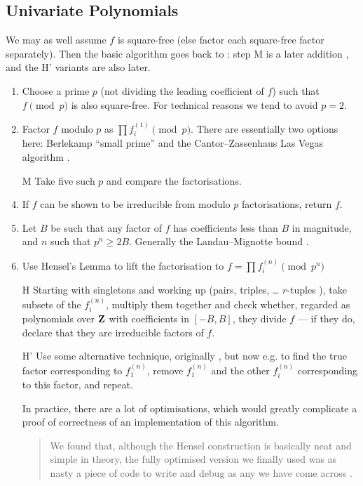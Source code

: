 \documentclass{llncs}
\begin{document}
\subsection{Univariate Polynomials}
We may as well assume $f$ is square-free (else factor each square-free factor separately). Then the basic algorithm goes back to \cite{Zassenhaus1969}: step M is a later addition \cite{Musser1975a}, and the  H' variants are also later.
\begin{enumerate}
\item Choose a prime $p$ (not dividing the leading coefficient of $f$) such that $f\pmod p$ is also square-free. For technical reasons we tend to avoid $p=2$.
\item\label{step:p} Factor $f$ modulo $p$ as $\prod f_i^{(1)} \pmod p$. There are essentially two options here: Berlekamp ``small prime'' \cite{Berlekamp1967} and the Cantor--Zassenhaus Las Vegas algorithm \cite{CantorZassenhaus1981}.
\item[M]Take five such $p$ and compare the factorisations.
\item If $f$ can be shown to be irreducible from modulo $p$ factorisations, return $f$.
\item Let $B$ be such that any factor of $f$ has coefficients less than $B$ in magnitude, and $n$ such that $p^n\ge 2B$. Generally the Landau--Mignotte bound \cite{Landau1905,Mignotte1974}.
\item Use Hensel's Lemma to lift the factorisation to $f=\prod f_i^{(n)} \pmod {p^n}$
\item[H]\label{step:H} Starting with singletons and working up (pairs, triples, \dots{} $r$-tuples \cite{Collins1979}), take subsets of the $f_i^{(n)}$, multiply them together and check whether, regarded as polynomials over ${\bf Z}$ with coefficients in $[-B,B]$, they divide $f$ --- if they do, declare that they are irreducible factors of $f$.
\item[H']\label{step:H'}Use some alternative technique, originally \cite{Lenstraetal1982}, but now e.g. \cite{Abbottetal2000a} to find the true factor corresponding to $f_1^{(n)}$, remove $f_1^{(n)}$ and the other $f_i^{(n)}$ corresponding to this factor, and repeat.
\item[\dbend]In practice, there are a lot of optimisations, which would greatly complicate a proof of correctness of an implementation of this algorithm.
\begin{quote}
We found that, although the Hensel construction is basically neat and simple in theory,
the fully optimised version we finally used was as nasty a piece of code to write and
debug as any we have come across \cite{MooreNorman1981}.
\end{quote}
\end{enumerate}
\end{document}

